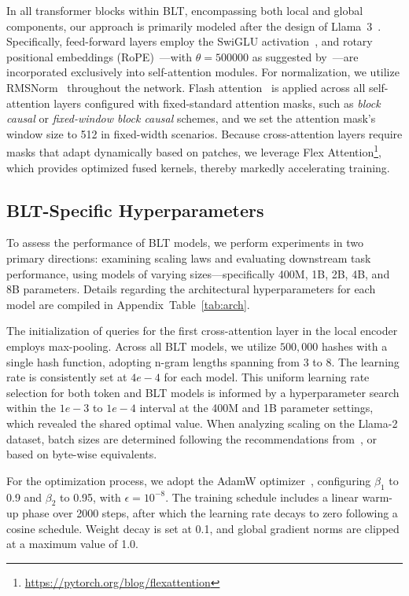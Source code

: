 In all transformer blocks within {\textsc BLT}, encompassing both local and global components, our approach is primarily modeled after the design of Llama~3~\citep{dubey2024llama}. Specifically, feed-forward layers employ the SwiGLU activation~\citep{swiglu}, and rotary positional embeddings (RoPE)~\citep{RoPe}—with $\theta=500000$ as suggested by~\citep{xiong2024effective}—are incorporated exclusively into self-attention modules. For normalization, we utilize RMSNorm~\citep{RMSNorm} throughout the network. Flash attention~\citep{dao2022flashattention} is applied across all self-attention layers configured with fixed-standard attention masks, such as \textit{block causal} or \textit{fixed-window block causal} schemes, and we set the attention mask’s window size to 512 in fixed-width scenarios. Because cross-attention layers require masks that adapt dynamically based on patches, we leverage Flex Attention\footnote{\url{https://pytorch.org/blog/flexattention}}, which provides optimized fused kernels, thereby markedly accelerating training.

\subsection{{\textsc BLT}-Specific Hyperparameters} To assess the performance of {\textsc BLT} models, we perform experiments in two primary directions: examining scaling laws and evaluating downstream task performance, using models of varying sizes—specifically 400M, 1B, 2B, 4B, and 8B parameters. Details regarding the architectural hyperparameters for each model are compiled in Appendix~Table~\ref{tab:arch}.

The initialization of queries for the first cross-attention layer in the local encoder employs max-pooling. Across all {\textsc BLT} models, we utilize $500,000$ hashes with a single hash function, adopting n-gram lengths spanning from 3 to 8. The learning rate is consistently set at $4e-4$ for each model. This uniform learning rate selection for both token and {\textsc BLT} models is informed by a hyperparameter search within the $1e-3$ to $1e-4$ interval at the 400M and 1B parameter settings, which revealed the shared optimal value. When analyzing scaling on the Llama-2 dataset, batch sizes are determined following the recommendations from~\cite{dubey2024llama}, or based on byte-wise equivalents.

For the optimization process, we adopt the AdamW optimizer~\citep{adamw}, configuring $\beta_1$ to 0.9 and $\beta_2$ to 0.95, with $\epsilon=10^{-8}$. The training schedule includes a linear warm-up phase over 2000 steps, after which the learning rate decays to zero following a cosine schedule. Weight decay is set at 0.1, and global gradient norms are clipped at a maximum value of 1.0.

